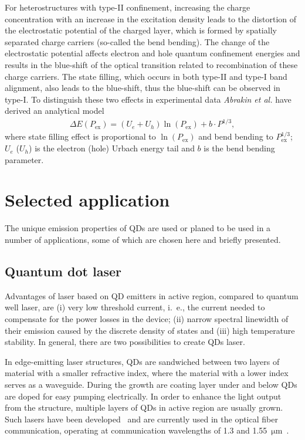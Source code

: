 \documentclass[
a4paper, %
11pt, %
onecolumn, %
openany, %
oldfontcommands,
]{memoir}
\begin{document}
For heterostructures with type-II confinement, increasing the charge concentration with an increase in the excitation density leads to the distortion of the electrostatic potential of the charged layer, which is formed by spatially separated charge carriers (so-called the bend bending). The change of the electrostatic potential affects electron and hole quantum confinement energies and results in the blue-shift of the optical transition related to recombination of these charge carriers. The state filling, which occurs in both type-II and type-I band alignment, also leads to the blue-shift, thus the blue-shift can be observed in type-I. To distinguish these two effects in experimental data \textit{Abrakin et al.} have derived an analytical model~\cite{Abramkin_blueshift_analytical}
\begin{eqnarray}
\Delta E\left(P_\mathrm{ex}\right)=\left(U_e+U_h\right)\ln\left(P_\mathrm{ex}\right) + b\cdot P^{1/3},
\end{eqnarray}
where state filling effect is proportional to $\ln\left( P_\mathrm{ex} \right)$ and bend bending to $P_\mathrm{ex}^{1/3}$; $U_e$ ($U_h$) is the electron (hole) Urbach energy tail and $b$ is the bend bending parameter.




\section{Selected application}
The unique emission properties of QDs are used or planed to be used in a number of applications, some of which are chosen here and briefly presented.
\subsection*{Quantum dot laser}
Advantages of laser based on QD emitters in active region, compared to quantum well laser, are (i) very low threshold current, i.~e., the current needed to compensate for the power losses in the device; (ii) narrow spectral linewidth of their emission caused by the discrete density of states and (iii) high temperature stability. In general, there are two possibilities to create QDs laser.

In edge-emitting laser structures, QDs are sandwiched between two layers of material with a smaller refractive index, where the material with a lower index serves as a waveguide. During the growth are coating layer under and below QDs are doped for easy pumping electrically. In order to enhance the light output from the structure, multiple layers of QDs in active region are usually grown. Such lasers have been developed~\cite{Kirstaedter,SellinAPL,SellinEL,Kovsh,Ledentsov} and are currently used in the optical fiber communication, operating at communication wavelengths of 1.3 and 1.55~$\mathrm{\mu m}$~\cite{QDlaser}. 
\end{document}
